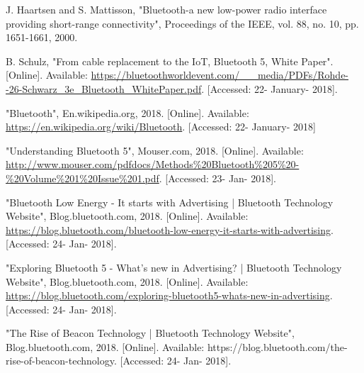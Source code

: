 \documentclass[journal, a4paper]{IEEEtran}
\begin{document}
\begin{thebibliography}{7}

J. Haartsen and S. Mattisson, "Bluetooth-a new low-power radio interface providing short-range connectivity", Proceedings of the IEEE, vol. 88, no. 10, pp. 1651-1661, 2000.

B. Schulz, "From cable replacement to the IoT, Bluetooth 5, White Paper". [Online]. Available: \url{https://bluetoothworldevent.com/_	_media/PDFs/Rohde--26-Schwarz_3e_Bluetooth_WhitePaper.pdf}. [Accessed: 22- January- 2018].

"Bluetooth", En.wikipedia.org, 2018. [Online]. Available: \url{https://en.wikipedia.org/wiki/Bluetooth}. [Accessed: 22- January- 2018]

"Understanding  Bluetooth 5", Mouser.com, 2018. [Online]. Available: \url{http://www.mouser.com/pdfdocs/Methods\%20Bluetooth\%205\%20-\%20Volume\%201\%20Issue\%201.pdf}. [Accessed: 23- Jan- 2018].

"Bluetooth Low Energy - It starts with Advertising | Bluetooth Technology Website", Blog.bluetooth.com, 2018. [Online]. Available: \url{https://blog.bluetooth.com/bluetooth-low-energy-it-starts-with-advertising}. [Accessed: 24- Jan- 2018].

"Exploring Bluetooth 5 - What's new in Advertising? | Bluetooth Technology Website", Blog.bluetooth.com, 2018. [Online]. Available: \url{https://blog.bluetooth.com/exploring-bluetooth5-whats-new-in-advertising}. [Accessed: 24- Jan- 2018].

"The Rise of Beacon Technology | Bluetooth Technology Website", Blog.bluetooth.com, 2018. [Online]. Available: https://blog.bluetooth.com/the-rise-of-beacon-technology. [Accessed: 24- Jan- 2018].

\end{thebibliography}
\end{document}
